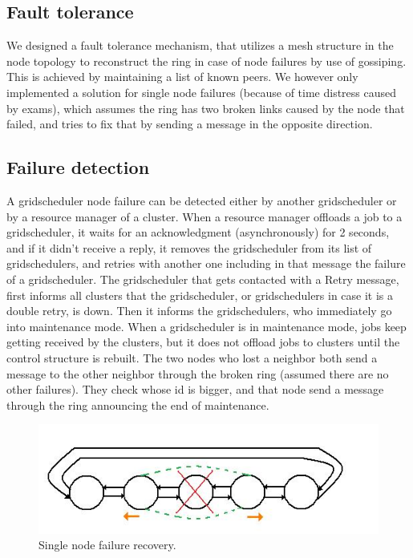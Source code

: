 \documentclass[twocolumn,a4paper]{article}
\begin{document}
\subsection{Fault tolerance}
We designed a fault tolerance mechanism, that utilizes a mesh structure in the node topology to reconstruct the ring in case of node failures by use of gossiping. This is achieved by maintaining a list of known peers. We however only implemented a solution for single node failures (because of time distress caused by exams), which assumes the ring has two broken links caused by the node that failed, and tries to fix that by sending a message in the opposite direction.

\subsection{Failure detection}
A gridscheduler node failure can be detected either by another gridscheduler or by a resource manager of a cluster.
When a resource manager offloads a job to a gridscheduler, it waits for an acknowledgment (asynchronously) for 2 seconds, and if it didn't receive a reply, it removes the gridscheduler from its list of gridschedulers, and retries with another one including in that message the failure of a gridscheduler. The gridscheduler that gets contacted with a Retry message, first informs all clusters that the gridscheduler, or gridschedulers in case it is a double retry, is down. Then it informs the gridschedulers, who immediately go into maintenance mode. When a gridscheduler is in maintenance mode, jobs keep getting received by the clusters, but it does not offload jobs to clusters until the control structure is rebuilt. The two nodes who lost a neighbor both send a message to the other neighbor through the broken ring (assumed there are no other failures). They check whose id is bigger, and that node send a message through the ring announcing the end of maintenance.

\begin{figure}
	\includegraphics[scale=0.6]{fttwo.jpg}
	\caption{Single node failure recovery.}
\end{figure}
\end{document}
